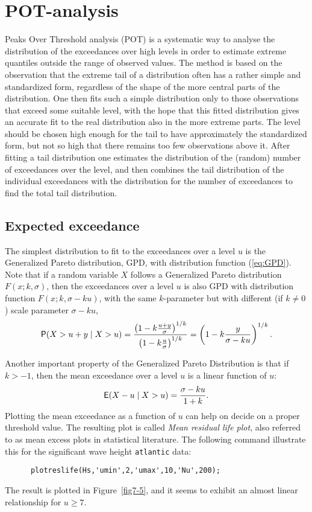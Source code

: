 \section{POT-analysis}

Peaks Over Threshold analysis (POT)
 is a systematic way to analyse
the distribution of the exceedances over high levels in order to
estimate extreme quantiles outside the range of observed values. The
method is based on the observation that the extreme tail of a
distribution often has a rather simple and standardized
form, regardless of the shape of the more central parts of the
distribution. One then fits such a simple distribution only to those
observations that exceed some suitable level, with the hope that
this fitted distribution gives an accurate fit to the
real distribution also in the more extreme parts. The level should be
chosen high enough for the tail to have approximately the
standardized form, but not so high that there remains too few
observations above it. After fitting a tail distribution one
estimates the distribution of the (random) number of exceedances over
the level, and then combines the tail distribution of the individual
exceedances with the distribution for the number of exceedances to
find the total tail distribution.

\subsection{Expected exceedance}
The simplest distribution to fit to the exceedances over a level $u$
is the Generalized Pareto distribution, GPD, with distribution function
(\ref{eq:GPD}).
Note that if a random variable $X$ follows a Generalized Pareto
distribution $F(x; k, {\sigma})$, then the exceedances over a level
$u$ is also GPD with distribution function
$F(x; k, {\sigma}-ku)$, with the same
$k$-parameter but with different (if $k \neq 0$)
scale parameter ${\sigma} - ku$,
$$
\mbox{\sf P} (X > u + y \mid X > u) = \frac{
\left(1 - k \frac{u+y}{{\sigma}}\right)^{1/k}}
{\left(1 - k \frac{u}{{\sigma}}\right)^{1/k}}
= \left(1 - k \frac{y}{{\sigma}-ku}\right)^{1/k}.
$$

Another important property of the Generalized Pareto Distribution is
that if $k > -1$, then the mean exceedance over a level $u$ is a
linear function of $u$:
$$
\mbox{\sf E} (X -u  \mid X > u) = \frac{{\sigma} - ku}{1+k}.
$$
Plotting the mean exceedance as a function of $u$ can help on decide on
a proper threshold value. The resulting plot is called
\emph{Mean residual life plot}, also referred to as mean
excess plots in statistical literature.
The following command illustrate this for the significant
wave height {\tt atlantic} data: 
{\small\begin{verbatim}
      plotreslife(Hs,'umin',2,'umax',10,'Nu',200);
\end{verbatim}} 
\noindent
The result is plotted in Figure~\ref{fig7-5}, and it seems to
exhibit an almost linear relationship for $u\geq 7$.

